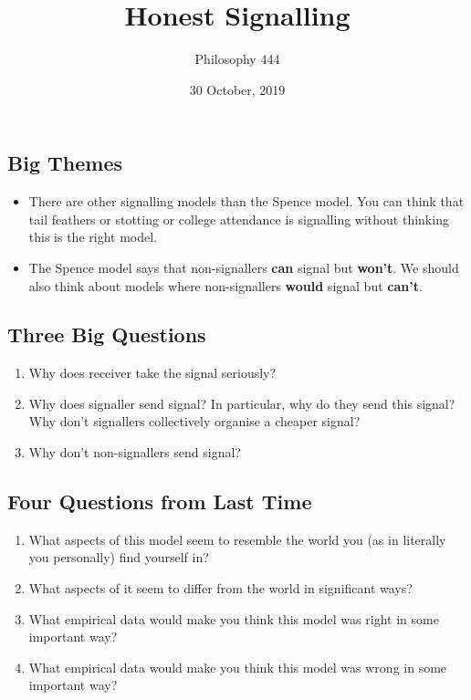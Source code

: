 \documentclass[11pt,]{article}
\title{Honest Signalling}
\author{Philosophy 444}
\date{30 October, 2019}
\providecommand{\tightlist}{%
  \setlength{\itemsep}{0pt}\setlength{\parskip}{0pt}}
\begin{document}
\maketitle

\hypertarget{big-themes}{%
\subsection{Big Themes}\label{big-themes}}

\begin{itemize}
\tightlist
\item
  There are other signalling models than the Spence model. You can think
  that tail feathers or stotting or college attendance is signalling
  without thinking this is the right model.
\item
  The Spence model says that non-signallers \textbf{can} signal but
  \textbf{won't}. We should also think about models where non-signallers
  \textbf{would} signal but \textbf{can't}.
\end{itemize}

\hypertarget{three-big-questions}{%
\subsection{Three Big Questions}\label{three-big-questions}}

\begin{enumerate}
\def\labelenumi{\arabic{enumi}.}
\tightlist
\item
  Why does receiver take the signal seriously?
\item
  Why does signaller send signal? In particular, why do they send this
  signal? Why don't signallers collectively organise a cheaper signal?
\item
  Why don't non-signallers send signal?
\end{enumerate}

\hypertarget{four-questions-from-last-time}{%
\subsection{Four Questions from Last
Time}\label{four-questions-from-last-time}}

\begin{enumerate}
\def\labelenumi{\arabic{enumi}.}
\tightlist
\item
  What aspects of this model seem to resemble the world you (as in
  literally you personally) find yourself in?
\item
  What aspects of it seem to differ from the world in significant ways?
\item
  What empirical data would make you think this model was right in some
  important way?
\item
  What empirical data would make you think this model was wrong in some
  important way?
\end{enumerate}
\end{document}
